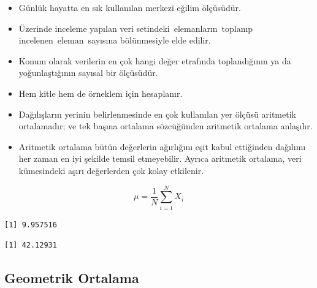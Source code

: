 \documentclass[
  letterpaper,
  DIV=11,
  numbers=noendperiod]{scrreprt}
\newenvironment{Shaded}{\begin{snugshade}}{\end{snugshade}}
\newcommand{\AttributeTok}[1]{\textcolor[rgb]{0.40,0.45,0.13}{#1}}
\newcommand{\CommentTok}[1]{\textcolor[rgb]{0.37,0.37,0.37}{#1}}
\newcommand{\ConstantTok}[1]{\textcolor[rgb]{0.56,0.35,0.01}{#1}}
\newcommand{\FunctionTok}[1]{\textcolor[rgb]{0.28,0.35,0.67}{#1}}
\newcommand{\NormalTok}[1]{\textcolor[rgb]{0.00,0.23,0.31}{#1}}
\newcommand{\SpecialCharTok}[1]{\textcolor[rgb]{0.37,0.37,0.37}{#1}}
\begin{document}
\begin{itemize}
\item
  Günlük hayatta en sık kullanılan merkezi eğilim ölçüsüdür.
\item
  Üzerinde inceleme yapılan veri setindeki~elemanların~toplanıp
  incelenen~eleman~sayısına bölünmesiyle elde edilir.
\item
  Konum olarak verilerin en çok hangi değer etrafında toplandığının ya
  da yoğunlaştığının sayısal bir ölçüsüdür.
\item
  Hem kitle hem de örneklem için hesaplanır.
\item
  Dağılışların yerinin belirlenmesinde en çok kullanılan yer ölçüsü
  aritmetik ortalamadır; ve tek başına ortalama sözcüğünden aritmetik
  ortalama anlaşılır.
\item
  Aritmetik ortalama bütün değerlerin ağırlığını eşit kabul ettiğinden
  dağılımı her zaman en iyi şekilde temsil etmeyebilir. Ayrıca aritmetik
  ortalama, veri kümesindeki aşırı değerlerden çok kolay etkilenir.
\end{itemize}

\[ \mu = \frac{1}{N}\sum_{i=1}^NX_i \]

\begin{Shaded}
\end{Shaded}

\begin{verbatim}
[1] 9.957516
\end{verbatim}

\begin{Shaded}
\end{Shaded}

\begin{verbatim}
[1] 42.12931
\end{verbatim}

\hypertarget{geometrik-ortalama}{%
\subsection*{Geometrik Ortalama}\label{geometrik-ortalama}}
\end{document}
